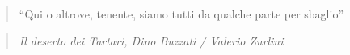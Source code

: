 \documentclass[12pt,b5paper]{book}
\let\origdoublepage\cleardoublepage
\newcommand{\clearemptydoublepage}{%
  \clearpage
  {\pagestyle{empty}\origdoublepage}%
}
\begin{document}
\thispagestyle{empty}
\vspace*{\fill} 
\begin{quote} 
\centering 
``Qui o altrove, tenente, siamo tutti da qualche parte per sbaglio''
\end{quote}
\begin{quote} 
\centering 
\textit{Il deserto dei Tartari, Dino Buzzati / Valerio Zurlini}
\end{quote}
\begin{quote} 
\centering 
\end{quote}
\vspace*{\fill}


\clearemptydoublepage
\newpage
\setcounter{tocdepth}{0}
\tableofcontents
\thispagestyle{empty}
\clearemptydoublepage %


\newpage
\renewcommand{\bibname}{References}











\end{document}
